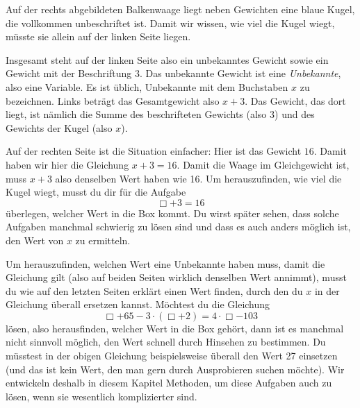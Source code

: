 \documentclass[../../main.tex]{subfiles}
\begin{document}
\begin{example}
    
    Auf der rechts abgebildeten Balkenwaage liegt neben Gewichten eine blaue Kugel, die vollkommen unbeschriftet ist. Damit wir wissen, wie viel die Kugel wiegt, müsste sie allein auf der linken Seite liegen.
    
    Insgesamt steht auf der linken Seite also ein unbekanntes Gewicht sowie ein Gewicht mit der Beschriftung 3. Das unbekannte Gewicht ist eine \emph{Unbekannte}, also eine Variable. Es ist üblich, Unbekannte mit dem Buchstaben $x$ zu bezeichnen. Links beträgt das Gesamtgewicht also $x+3$. Das Gewicht, das dort liegt, ist nämlich die Summe des beschrifteten Gewichts (also 3) und des Gewichts der Kugel (also $x$).
    
    Auf der rechten Seite ist die Situation einfacher: Hier ist das Gewicht $16$. Damit haben wir hier die Gleichung $x+3=16$. Damit die Waage im Gleichgewicht ist, muss $x+3$ also denselben Wert haben wie 16. Um herauszufinden, wie viel die Kugel wiegt, musst du dir für die Aufgabe 
    \[\Box+3=16\] 
    überlegen, welcher Wert in die Box kommt. Du wirst später sehen, dass solche Aufgaben manchmal schwierig zu lösen sind und dass es auch anders möglich ist, den Wert von $x$ zu ermitteln.
\end{example}

Um herauszufinden, welchen Wert eine Unbekannte haben muss, damit die Gleichung gilt (also auf beiden Seiten wirklich denselben Wert annimmt), musst du wie auf den letzten Seiten erklärt einen Wert finden, durch den du $x$ in der Gleichung überall ersetzen kannst. Möchtest du die Gleichung
\[\Box+65-3\cdot(\Box+2)=4\cdot \Box-103\]
lösen, also herausfinden, welcher Wert in die Box gehört, dann ist es manchmal nicht sinnvoll möglich, den Wert schnell durch Hinsehen zu bestimmen. Du müsstest in der obigen Gleichung beispielsweise überall den Wert 27 einsetzen (und das ist kein Wert, den man gern durch Ausprobieren suchen möchte). Wir entwickeln deshalb in diesem Kapitel Methoden, um diese Aufgaben auch zu lösen, wenn sie wesentlich komplizierter sind.
\end{document}
